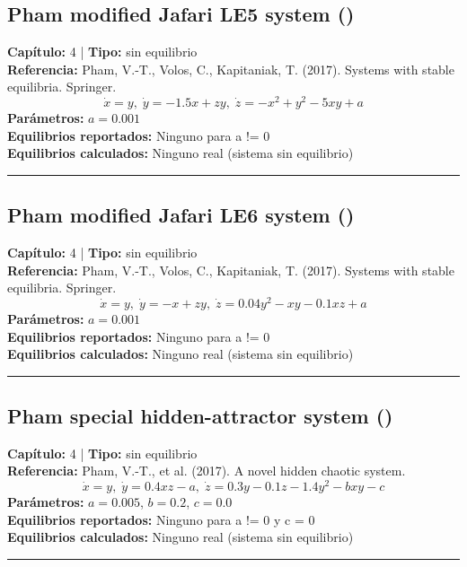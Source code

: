 \subsection*{Pham modified Jafari LE5 system ()}
\textbf{Capítulo:} 4 | \textbf{Tipo:} sin equilibrio\\
\textbf{Referencia:} Pham, V.-T., Volos, C., Kapitaniak, T. (2017). Systems with stable equilibria. Springer.\\
\[\dot{x}=y, \; \dot{y}=-1.5x+zy, \; \dot{z}=-x^2+y^2-5xy+a\]
\textbf{Parámetros:} $a = 0.001$\\
\textbf{Equilibrios reportados:} Ninguno para a != 0\\
\textbf{Equilibrios calculados:} Ninguno real (sistema sin equilibrio)\\
\hrule

\subsection*{Pham modified Jafari LE6 system ()}
\textbf{Capítulo:} 4 | \textbf{Tipo:} sin equilibrio\\
\textbf{Referencia:} Pham, V.-T., Volos, C., Kapitaniak, T. (2017). Systems with stable equilibria. Springer.\\
\[\dot{x}=y, \; \dot{y}=-x+zy, \; \dot{z}=0.04y^2-xy-0.1xz+a\]
\textbf{Parámetros:} $a = 0.001$\\
\textbf{Equilibrios reportados:} Ninguno para a != 0\\
\textbf{Equilibrios calculados:} Ninguno real (sistema sin equilibrio)\\
\hrule

\subsection*{Pham special hidden-attractor system ()}
\textbf{Capítulo:} 4 | \textbf{Tipo:} sin equilibrio\\
\textbf{Referencia:} Pham, V.-T., et al. (2017). A novel hidden chaotic system.\\
\[\dot{x}=y, \; \dot{y}=0.4xz-a, \; \dot{z}=0.3y-0.1z-1.4y^2-bxy-c\]
\textbf{Parámetros:} $a = 0.005$, $b = 0.2$, $c = 0.0$\\
\textbf{Equilibrios reportados:} Ninguno para a != 0 y c = 0\\
\textbf{Equilibrios calculados:} Ninguno real (sistema sin equilibrio)\\
\hrule

